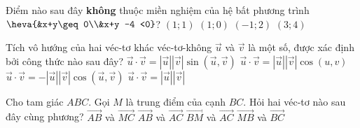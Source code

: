 \begin{ex}%
	Điểm nào sau đây {\bf không} thuộc miền nghiệm của hệ bất phương trình $\heva{&x+y\geq 0\\&x+y -4 <0}$?
	\choice
	{$(1;1)$}
	{$(1;0)$}
	{$(-1;2)$}
	{\True $(3;4)$}
\end{ex}

\begin{ex}%
	Tích vô hướng của hai véc-tơ khác véc-tơ-không $\overrightarrow{u}$ và $\overrightarrow{v}$ là một số, được xác định bởi công thức nào sau đây?
	\choice
	{$\overrightarrow{u}\cdot\overrightarrow{v}=\left|\overrightarrow{u}\right|\left|\overrightarrow{v}\right|\sin \left(\overrightarrow{u},\overrightarrow{v}\right)$}
	{$\overrightarrow{u}\cdot \overrightarrow{v} = \left|\overrightarrow{u}\right|\left|\overrightarrow{v}\right|\cos \left(u,v\right)$}
	{$\overrightarrow{u}\cdot \overrightarrow{v} = -\left|\overrightarrow{u}\right|\left|\overrightarrow{v}\right|\cos\left(\overrightarrow{u},\overrightarrow{v}\right)$}
	{\True $\overrightarrow{u}\cdot \overrightarrow{v} = \left|\overrightarrow{u}\right|\left|\overrightarrow{v}\right|$}
\end{ex}

\begin{ex}%
	Cho tam giác $ABC$. Gọi $M$ là trung điểm của cạnh $BC$. Hỏi hai véc-tơ nào sau đây cùng phương?
	\choice
	{$\overrightarrow{AB}$ và $\overrightarrow{MC}$}
	{$\overrightarrow{AB}$ và $\overrightarrow{AC}$}
	{$\overrightarrow{BM}$ và $\overrightarrow{AC}$}
	{\True $\overrightarrow{MB}$ và $\overrightarrow{BC}$}
\end{ex}

